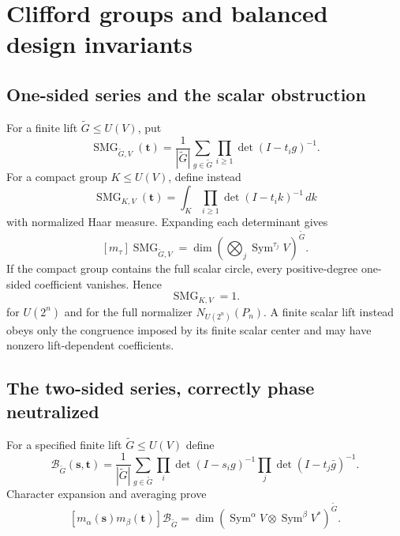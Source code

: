 \documentclass[10pt]{article}
\newcommand{\SMG}{\operatorname{SMG}}
\begin{document}
\section{Clifford groups and balanced design invariants}\label{proof:clifford}
\begingroup
{}
\providecommand{\Sgm}{\SMG}
\renewcommand{\Sgm}{\SMG}
\providecommand{\Bmgf}{\mathcal B}
\renewcommand{\Bmgf}{\mathcal B}
\setcounter{theorem}{0}
\setcounter{proposition}{0}
\setcounter{lemma}{0}
\setcounter{corollary}{0}
\setcounter{remark}{0}
\begin{abstract}
The ordinary one-sided sigma--MGF does not detect unitary-design order.  We
prove the correct two-sided coefficient statement, isolate a further phase
subtlety, and verify the design-detecting coefficient by closing explicit
projective Clifford matrix groups in dimensions $2$ and $4$.  The computed
frame potentials agree with Haar through degree three and differ at degree
four: $(1,2,5,15)$ versus $(1,2,5,14)$ in dimension two, and
$(1,2,6,29)$ versus $(1,2,6,24)$ in dimension four.
\end{abstract}

\subsection{One-sided series and the scalar obstruction}
For a finite lift $\widetilde G\leq U(V)$, put
\[
\Sgm_{\widetilde G,V}(\mathbf t)=\frac1{|\widetilde G|}\sum_{g\in\widetilde G}
 \prod_{i\geq1}\det(I-t_i g)^{-1}.
\]
For a compact group $K\leq U(V)$, define instead
\[
\Sgm_{K,V}(\mathbf t)=\int_K\prod_{i\geq1}\det(I-t_i k)^{-1}\,dk
\]
with normalized Haar measure.
Expanding each determinant gives
\[
[m_\tau]\Sgm_{\widetilde G,V}=\dim\left(\bigotimes_j
\operatorname{Sym}^{\tau_j}V\right)^{\widetilde G}.
\]
If the compact group contains the full scalar circle, every positive-degree
one-sided coefficient vanishes.  Hence
\[
\boxed{\Sgm_{K,V}=1.}
\]
for $U(2^n)$ and for the full normalizer $N_{U(2^n)}(P_n)$.  A finite scalar
lift instead obeys only the congruence imposed by its finite scalar center and
may have nonzero lift-dependent coefficients.

\subsection{The two-sided series, correctly phase neutralized}
For a specified finite lift $\widetilde G\leq U(V)$ define
\[
\Bmgf_{\widetilde G}(\mathbf s,\mathbf t)
=\frac1{|\widetilde G|}\sum_{g\in\widetilde G}
 \prod_i\det(I-s_i g)^{-1}\prod_j\det(I-t_j\bar g)^{-1}.
\]
Character expansion and averaging prove
\begin{equation}\label{clifford-groups-proof-and-verification:eq:two-sided}
[m_\alpha(\mathbf s)m_\beta(\mathbf t)]\Bmgf_{\widetilde G}
=\dim\left(\operatorname{Sym}^{\alpha}V\otimes
\operatorname{Sym}^{\beta}V^*\right)^{\widetilde G}.
\end{equation}
\end{document}

